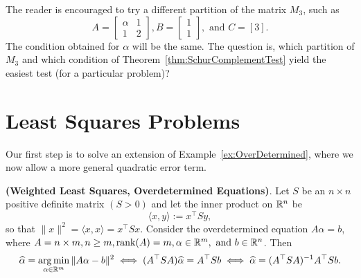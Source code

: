 The reader is encouraged to try a different partition of the matrix $M_3$, such as 
$$A = \left[ \begin{array}{rr} \alpha  & 1\\ 1 & 2\end{array} \right], B = \left[ \begin{array}{r} 1 \\ 1\end{array} \right] , \text{ and } C = [3].$$
The condition obtained for $\alpha$ will be the same. The question is, which partition of $M_3$ and which condition of Theorem~\ref{thm:SchurComplementTest} yield the easiest test (for a particular problem)?

\Qed

\section{Least Squares Problems}



Our first step is to solve an extension of Example~\ref{ex:OverDetermined}, where we now allow a more general quadratic error term.

\begin{prop}
\label{prop:WLS}
\textbf{(Weighted Least Squares, Overdetermined Equations)}. Let $S$ be an $n \times n$ positive definite matrix $(S>0)$
    and let the inner product on $\mathbb R^n$ be
    \begin{equation*}
        \langle x, y \rangle := x^\top S y,
    \end{equation*}
    so that  $ \| x \|^2=\langle x,x\rangle=x^\top S x $. 
Consider the overdetermined equation $A \alpha = b$, where $A = n \times m, n \geq m, \mathrm{rank}(A)=m, \alpha \in \mathbb R^m, \text{ and } b \in \mathbb R^n $. Then
    \begin{equation*}
       \widehat{\alpha}  = \operatorname*{arg\,min}_{\alpha \in \mathbb R^m} \| A\alpha-b \|^2 \iff  (A^\top SA) \widehat{\alpha} =A^\top Sb \iff \widehat{\alpha}=(A^\top S A)^{-1}A^\top S b.
    \end{equation*}
\end{prop}

